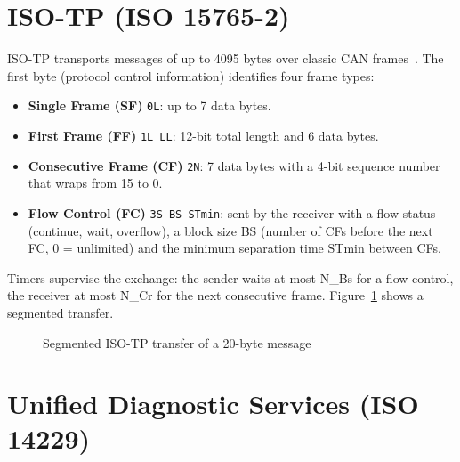\section{ISO-TP (ISO 15765-2)}

ISO-TP transports messages of up to 4095 bytes over classic CAN frames~\cite{ISO15765-2}. The first byte (protocol control information) identifies four frame types:
\begin{itemize}[nosep]
  \item \textbf{Single Frame (SF)} \texttt{0L}: up to 7 data bytes.
  \item \textbf{First Frame (FF)} \texttt{1L LL}: 12-bit total length and 6 data bytes.
  \item \textbf{Consecutive Frame (CF)} \texttt{2N}: 7 data bytes with a 4-bit sequence number that wraps from 15 to 0.
  \item \textbf{Flow Control (FC)} \texttt{3S BS STmin}: sent by the receiver with a flow status (continue, wait, overflow), a block size BS (number of CFs before the next FC, 0 = unlimited) and the minimum separation time STmin between CFs.
\end{itemize}
Timers supervise the exchange: the sender waits at most N\_Bs for a flow control, the receiver at most N\_Cr for the next consecutive frame. Figure~\ref{fig:isotp_seq} shows a segmented transfer.

\begin{figure}[H]
\centering
{}
\caption{Segmented ISO-TP transfer of a 20-byte message}
\label{fig:isotp_seq}
\end{figure}

\section{Unified Diagnostic Services (ISO 14229)}

